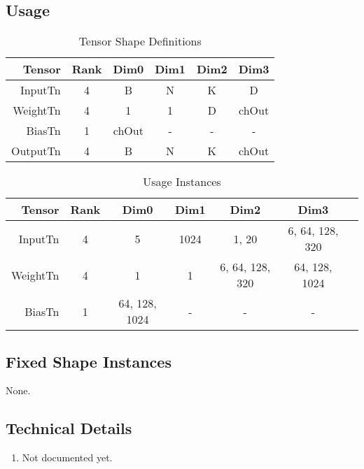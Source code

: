 \documentclass[•]{article}
\begin{document}
\subsection{Usage}
\begin{table}[htbp] %
\caption{Tensor Shape Definitions}
\label{tab:shapes_concat}
	\begin{center}
		\begin{tabular}{|r|c|c|c|c|c|} 
		\hline	
		Tensor & Rank & Dim0 & Dim1 & Dim2 & Dim3\\ 
		\hline	
		InputTn &
			4 & 
			B &
			N &
			K &
			D\\ 
		\hline	
		WeightTn &
			4 & 
			1 &
			1 &
			D &
			chOut\\ 
		\hline
		BiasTn &
			1 & 
			chOut &
			- &
			- &
			-\\ 
		\hline
		OutputTn &
			4 & 
			B & 
			N & 
			K &
			chOut \\
		\hline
		\end{tabular}
	\end{center}
\end{table}

\begin{table}[htbp] %
\caption{Usage Instances}
\label{tab:shapes_transpose}
	\begin{center}
		\begin{tabular}{|r|c|c|c|c|c|c|} 
		\hline	
		Tensor & Rank & Dim0 & Dim1 & Dim2 & Dim3\\ 
		\hline	
		InputTn &
			4 &
			5 &
			1024 &
			1, 20 &
			6, 64, 128, 320\\ 
		\hline
		WeightTn &
			4 &
			1 &
			1 &
			6, 64, 128, 320 &
			64, 128, 1024\\ 
		\hline
		BiasTn &
			1 &
			64, 128, 1024 &
			- &
			- &
			-\\ 
		\hline
		\end{tabular}
	\end{center}
\end{table}


\subsection{Fixed Shape Instances}
None.

\subsection{Technical Details}
\begin{enumerate}
\item Not documented yet.
\end{enumerate}
\end{document}

